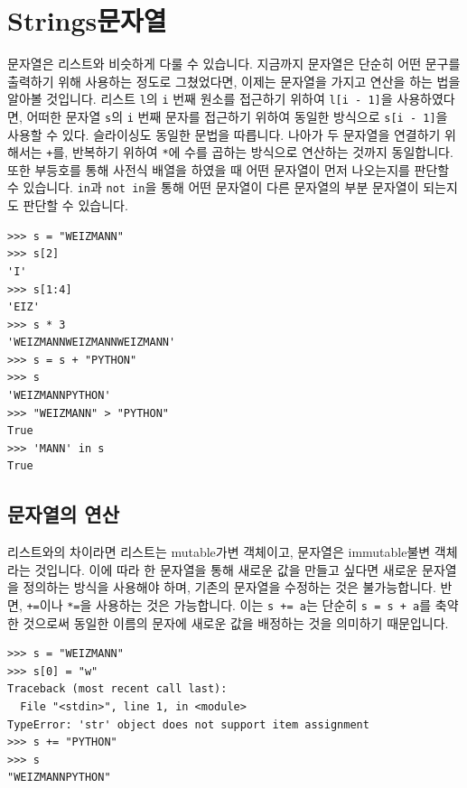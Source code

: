 \documentclass[../main.tex]{subfiles}
\begin{document}
\section{Strings문자열}
문자열은 리스트와 비슷하게 다룰 수 있습니다.
지금까지 문자열은 단순히 어떤 문구를 출력하기 위해 사용하는 정도로 그쳤었다면, 이제는 문자열을 가지고 연산을 하는 법을 알아볼 것입니다.
리스트 \texttt{l}의 \texttt{i} 번째 원소를 접근하기 위하여 \texttt{l[i - 1]}을 사용하였다면, 어떠한 문자열 \texttt{s}의 \texttt{i} 번째 문자를 접근하기 위하여 동일한 방식으로 \texttt{s[i - 1]}을 사용할 수 있다.
슬라이싱도 동일한 문법을 따릅니다.
나아가 두 문자열을 연결하기 위해서는 \texttt{+}를, 반복하기 위하여 \texttt{*}에 수를 곱하는 방식으로 연산하는 것까지 동일합니다.
또한 부등호를 통해 사전식 배열을 하였을 때 어떤 문자열이 먼저 나오는지를 판단할 수 있습니다.
\texttt{in}과 \texttt{not in}을 통해 어떤 문자열이 다른 문자열의 부분 문자열이 되는지도 판단할 수 있습니다.
\begin{verbatim}
>>> s = "WEIZMANN"
>>> s[2]
'I'
>>> s[1:4]
'EIZ'
>>> s * 3
'WEIZMANNWEIZMANNWEIZMANN'
>>> s = s + "PYTHON"
>>> s
'WEIZMANNPYTHON'
>>> "WEIZMANN" > "PYTHON"
True
>>> 'MANN' in s
True
\end{verbatim}

\subsection{문자열의 연산}
리스트와의 차이라면 리스트는 mutable가변 객체이고, 문자열은 immutable불변 객체라는 것입니다.
이에 따라 한 문자열을 통해 새로운 값을 만들고 싶다면 새로운 문자열을 정의하는 방식을 사용해야 하며, 기존의 문자열을 수정하는 것은 불가능합니다.
반면, \texttt{+=}이나 \texttt{*=}을 사용하는 것은 가능합니다.
이는 \texttt{s += \textquotesingle a\textquotesingle}는 단순히 \texttt{s = s + \textquotesingle a\textquotesingle}를 축약한 것으로써 동일한 이름의 문자에 새로운 값을 배정하는 것을 의미하기 때문입니다.
\begin{verbatim}
>>> s = "WEIZMANN"
>>> s[0] = "w"
Traceback (most recent call last):
  File "<stdin>", line 1, in <module>
TypeError: 'str' object does not support item assignment
>>> s += "PYTHON"
>>> s
"WEIZMANNPYTHON"
\end{verbatim}
\end{document}
